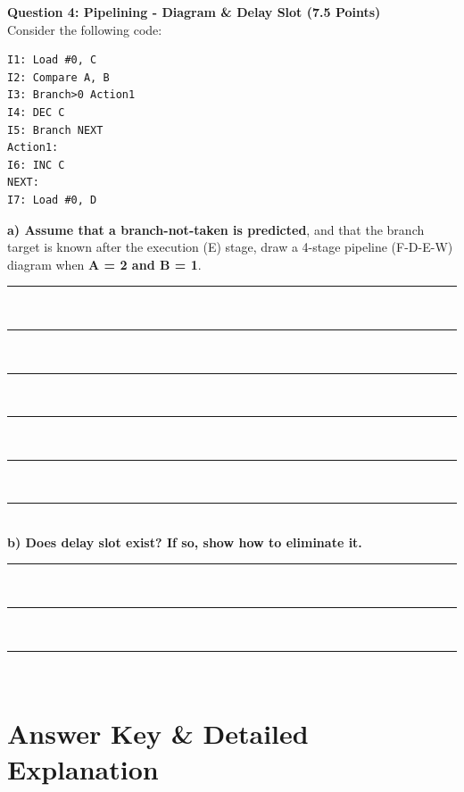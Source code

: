 \documentclass[12pt]{article}
\begin{document}
\newpage
\textbf{Question 4: Pipelining - Diagram \& Delay Slot (7.5 Points)} \\
Consider the following code:
\begin{lstlisting}[language={[x86masm]Assembler}]
I1: Load #0, C       
I2: Compare A, B     
I3: Branch>0 Action1 
I4: DEC C            
I5: Branch NEXT
Action1: 
I6: INC C   
NEXT: 
I7: Load #0, D
\end{lstlisting}

\textbf{a) Assume that a branch-not-taken is predicted}, and that the branch target is known after the execution (E) stage, draw a 4-stage pipeline (F-D-E-W) diagram when \textbf{A = 2 and B = 1}. \\
\rule{\textwidth}{0.4pt} \\
\rule{\textwidth}{0.4pt} \\
\rule{\textwidth}{0.4pt} \\
\rule{\textwidth}{0.4pt} \\
\rule{\textwidth}{0.4pt} \\
\rule{\textwidth}{0.4pt} \\

\vspace{1cm}
\textbf{b) Does delay slot exist? If so, show how to eliminate it.} \\
\rule{\textwidth}{0.4pt} \\
\rule{\textwidth}{0.4pt} \\
\rule{\textwidth}{0.4pt} \\


\newpage
\section*{Answer Key \& Detailed Explanation}
\end{document}
